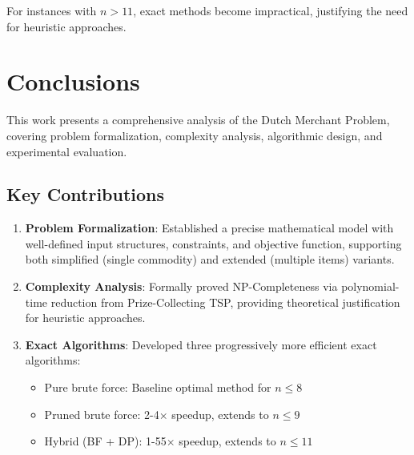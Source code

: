 \documentclass[12pt]{article}
\begin{document}
For instances with $n > 11$, exact methods become impractical, justifying the need for heuristic approaches.

\section{Conclusions}
\label{sec:conclusions}

This work presents a comprehensive analysis of the Dutch Merchant Problem, covering problem formalization, complexity analysis, algorithmic design, and experimental evaluation.

\subsection{Key Contributions}

\begin{enumerate}
    \item \textbf{Problem Formalization}: Established a precise mathematical model with well-defined input structures, constraints, and objective function, supporting both simplified (single commodity) and extended (multiple items) variants.
    
    \item \textbf{Complexity Analysis}: Formally proved NP-Completeness via polynomial-time reduction from Prize-Collecting TSP, providing theoretical justification for heuristic approaches.
    
    \item \textbf{Exact Algorithms}: Developed three progressively more efficient exact algorithms:
    \begin{itemize}
        \item Pure brute force: Baseline optimal method for $n \leq 8$
        \item Pruned brute force: 2-4$\times$ speedup, extends to $n \leq 9$
        \item Hybrid (BF + DP): 1-55$\times$ speedup, extends to $n \leq 11$
    \end{itemize}
    

\end{enumerate}
\end{document}
